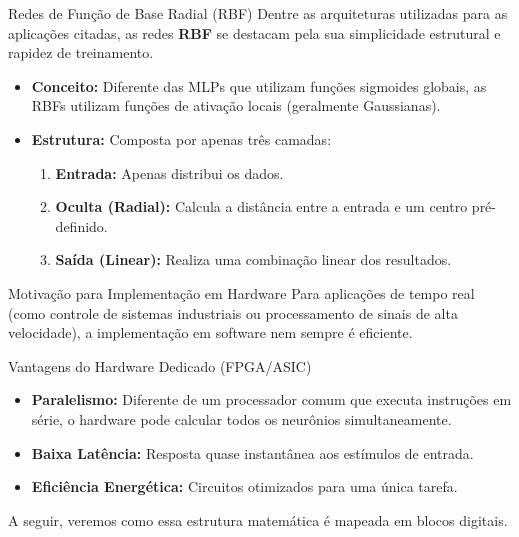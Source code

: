 \documentclass[aspectratio=169]{beamer}
\begin{document}
\begin{frame}{Redes de Função de Base Radial (RBF)}
	\justifying
	Dentre as arquiteturas utilizadas para as aplicações citadas, as redes \textbf{RBF} se destacam pela sua simplicidade estrutural e rapidez de treinamento. 
	
	\begin{itemize}
		\item \textbf{Conceito:} Diferente das MLPs que utilizam funções sigmoides globais, as RBFs utilizam funções de ativação locais (geralmente Gaussianas).
		\item \textbf{Estrutura:} Composta por apenas três camadas:
		\begin{enumerate}
			\item \textbf{Entrada:} Apenas distribui os dados.
			\item \textbf{Oculta (Radial):} Calcula a distância entre a entrada e um centro pré-definido.
			\item \textbf{Saída (Linear):} Realiza uma combinação linear dos resultados.
		\end{enumerate}
	\end{itemize}
\end{frame}

\begin{frame}{Motivação para Implementação em Hardware}
	\justifying
	Para aplicações de tempo real (como controle de sistemas industriais ou processamento de sinais de alta velocidade), a implementação em software nem sempre é eficiente.
	
	\begin{block}{Vantagens do Hardware Dedicado (FPGA/ASIC)}
		\begin{itemize}
			\item \textbf{Paralelismo:} Diferente de um processador comum que executa instruções em série, o hardware pode calcular todos os neurônios simultaneamente.
			\item \textbf{Baixa Latência:} Resposta quase instantânea aos estímulos de entrada.
			\item \textbf{Eficiência Energética:} Circuitos otimizados para uma única tarefa.
		\end{itemize}
	\end{block}
	
	A seguir, veremos como essa estrutura matemática é mapeada em blocos digitais.
\end{frame}
\end{document}
